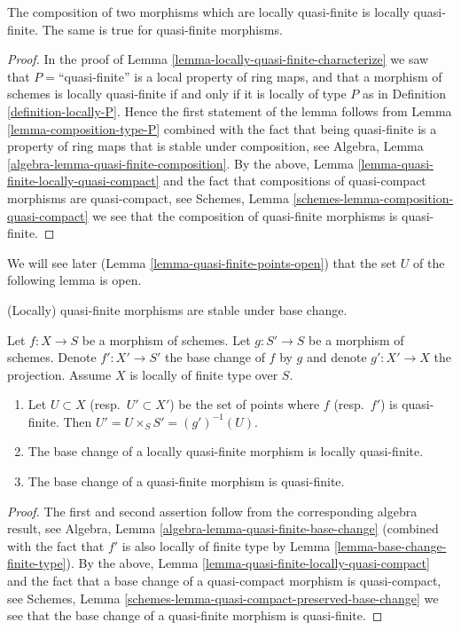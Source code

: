 \begin{lemma}
\label{lemma-composition-quasi-finite}
The composition of two morphisms which are locally quasi-finite is
locally quasi-finite. The same is true for quasi-finite morphisms.
\end{lemma}

\begin{proof}
In the proof of Lemma \ref{lemma-locally-quasi-finite-characterize}
we saw that $P = $``quasi-finite'' is a local property of ring maps,
and that a morphism of schemes is locally quasi-finite if and only if
it is locally of type $P$ as in Definition \ref{definition-locally-P}.
Hence the first statement of the lemma follows from
Lemma \ref{lemma-composition-type-P} combined
with the fact that being quasi-finite is a property of ring maps that is
stable under composition, see
Algebra, Lemma \ref{algebra-lemma-quasi-finite-composition}.
By the above, Lemma \ref{lemma-quasi-finite-locally-quasi-compact}
and the fact that compositions of
quasi-compact morphisms are quasi-compact, see
Schemes, Lemma \ref{schemes-lemma-composition-quasi-compact}
we see that the composition of quasi-finite morphisms is
quasi-finite.
\end{proof}

\noindent
We will see later (Lemma \ref{lemma-quasi-finite-points-open})
that the set $U$ of the following lemma is open.

\begin{lemma}
\label{lemma-base-change-quasi-finite}
\begin{slogan}
(Locally) quasi-finite morphisms are stable under base change.
\end{slogan}
Let $f : X \to S$ be a morphism of schemes.
Let $g : S' \to S$ be a morphism of schemes.
Denote $f' : X' \to S'$ the base change of $f$ by $g$
and denote $g' : X' \to X$ the projection.
Assume $X$ is locally of finite type over $S$.
\begin{enumerate}
\item Let $U \subset X$ (resp.\ $U' \subset X'$)
be the set of points where $f$ (resp.\ $f'$) is quasi-finite.
Then $U' = U \times_S S' = (g')^{-1}(U)$.
\item The base change of a locally quasi-finite morphism is
locally quasi-finite.
\item The base change of a quasi-finite morphism is
quasi-finite.
\end{enumerate}
\end{lemma}

\begin{proof}
The first and second assertion follow from the corresponding
algebra result, see
Algebra, Lemma \ref{algebra-lemma-quasi-finite-base-change}
(combined with the fact that $f'$ is also locally of finite type by
Lemma \ref{lemma-base-change-finite-type}).
By the above, Lemma \ref{lemma-quasi-finite-locally-quasi-compact}
and the fact that a base change of a
quasi-compact morphism is quasi-compact, see
Schemes, Lemma \ref{schemes-lemma-quasi-compact-preserved-base-change}
we see that the base change of a quasi-finite morphism
is quasi-finite.
\end{proof}

